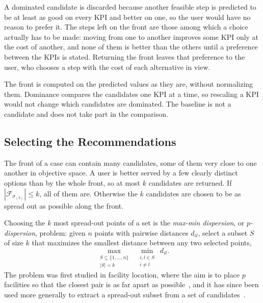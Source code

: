 A dominated candidate is discarded because another feasible step is
predicted to be at least as good on every KPI and better on one, so the user
would have no reason to prefer it. The steps left on the front are those
among which a choice actually has to be made: moving from one to another
improves some KPI only at the cost of another, and none of them is better
than the others until a preference between the KPIs is stated. Returning the
front leaves that preference to the user, who chooses a step with the cost
of each alternative in view.

The front is computed on the predicted values as they are, without
normalizing them. Dominance compares the candidates one KPI at a time, so
rescaling a KPI would not change which candidates are dominated. The
baseline is not a candidate and does not take part in the comparison.


\subsection{Selecting the Recommendations}
\label{subsec:met:online:selection}
The front of a case can contain many candidates, some of them very close to
one another in objective space. A user is better served by a few clearly
distinct options than by the whole front, so at most $k$ candidates are
returned. If $|\mathcal{F}_{\sigma_{(k)}}| \le k$, all of them are. Otherwise
the $k$ candidates are chosen to be as spread out as possible along the
front.

Choosing the $k$ most spread-out points of a set is the \emph{max-min
dispersion}, or \emph{$p$-dispersion}, problem: given $n$ points with
pairwise distances $d_{il}$, select a subset $S$ of size $k$ that maximizes
the smallest distance between any two selected points,
\begin{equation}
  \max_{\substack{S \subseteq \{1, \dots, n\} \\ |S| = k}}\ \
  \min_{\substack{i, l \in S \\ i \neq l}}\ d_{il}.
  \label{eq:met:on:dispersion}
\end{equation}
The problem was first studied in facility location, where the aim is to
place $p$ facilities so that the closest pair is as far apart as
possible~\cite{kuby1987}, and it has since been used more generally to
extract a spread-out subset from a set of candidates~\cite{maliszewski2012}.

